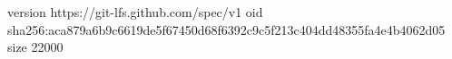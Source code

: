 version https://git-lfs.github.com/spec/v1
oid sha256:aca879a6b9c6619de5f67450d68f6392c9c5f213c404dd48355fa4e4b4062d05
size 22000
